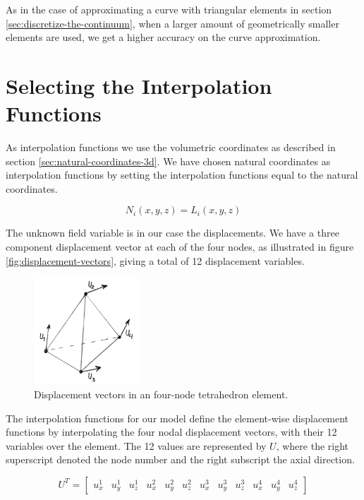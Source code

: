 As in the case of approximating a curve with triangular elements in
section \vref{sec:discretize-the-continuum}, when a larger amount of
geometrically smaller elements are used, we get a higher accuracy on
the curve approximation.

\section{Selecting the Interpolation Functions}
\label{sec:the-interpolation-functions-we-have-chosen}
As interpolation functions we use the volumetric coordinates as described
in section \vref{sec:natural-coordinates-3d}.
We have chosen natural coordinates as interpolation functions by
setting the interpolation functions equal to the natural
coordinates.

\begin{equation}
N_i(x,y,z) = L_i(x,y,z)
\end{equation}

The unknown field variable is in our case the displacements. We have a
three component displacement vector at each of the four nodes, as
illustrated in figure \vref{fig:displacement-vectors}, giving a total
of 12 displacement variables.
 
\begin{figure}
  \centering
  \includegraphics[width=4cm]{./images/finite_element_method_displacement_vectors.png}
\caption{Displacement vectors in an four-node tetrahedron element.}
\label{fig:displacement-vectors}
\end{figure}

The interpolation functions for our model define the element-wise
displacement functions by interpolating the four nodal displacement
vectors, with their 12 variables over the element. The 12 values are
represented by $U$, where the right superscript denoted the node
number and the right subscript the axial direction.

\begin{equation}
U^T = \left[
\begin{array}{cccccccccccc}
u^{1}_x & u^{1}_y & u^{1}_z & 
u^{2}_x & u^{2}_y & u^{2}_z &
u^{3}_x & u^{3}_y & u^{3}_z & 
u^{4}_x & u^{4}_y & u^{4}_z 
\end{array}
\right]
\end{equation}

